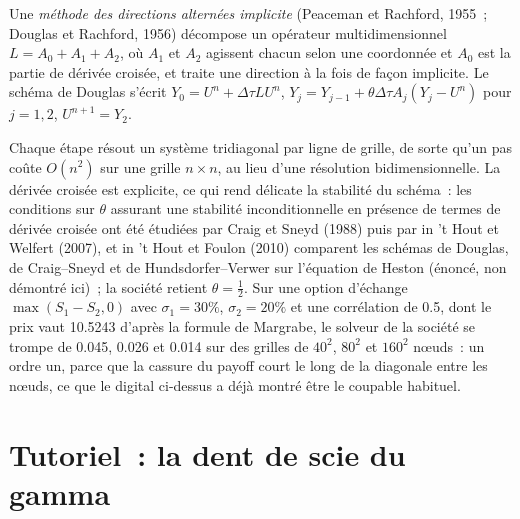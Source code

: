 \begin{definition}\label{def:qm:finite-difference-methods:adi}
Une \emph{méthode des directions alternées implicite} (Peaceman et Rachford, 1955~; Douglas et Rachford, 1956) décompose un opérateur multidimensionnel $L = A_0 + A_1 +
A_2$, où $A_1$ et $A_2$ agissent chacun selon une coordonnée et $A_0$ est la partie de dérivée croisée, et traite une direction à la fois de façon implicite. Le schéma de Douglas s'écrit $Y_0 = U^n + \Delta\tau LU^n$, $Y_j =
Y_{j-1} + \theta\Delta\tau A_j(Y_j - U^n)$ pour $j = 1, 2$, $U^{n+1} = Y_2$.
\end{definition}

Chaque étape résout un système tridiagonal par ligne de grille, de sorte qu'un pas coûte $O(n^2)$ sur une grille $n \times n$, au lieu d'une résolution bidimensionnelle. La dérivée croisée est explicite, ce qui rend délicate la stabilité du
schéma~: les conditions sur $\theta$ assurant une stabilité inconditionnelle en présence de termes de dérivée croisée ont été étudiées par Craig et Sneyd (1988) puis par in 't Hout et Welfert (2007), et in 't Hout et
Foulon (2010) comparent les schémas de Douglas, de Craig--Sneyd et de Hundsdorfer--Verwer sur l'équation de Heston (énoncé, non démontré ici)~; la société retient $\theta = \frac12$. Sur une option d'échange $\max(S_1 - S_2, 0)$ avec $\sigma_1 = 30\%$, $\sigma_2 = 20\%$ et une corrélation de 0.5, dont le prix vaut 10.5243 d'après la formule de Margrabe, le solveur de la société
se trompe de 0.045, 0.026 et 0.014 sur des grilles de $40^2$, $80^2$ et $160^2$ nœuds~: un ordre un, parce que la cassure du payoff court le long de la diagonale entre les nœuds, ce que le digital ci-dessus a déjà montré être
le coupable habituel.

\section{Tutoriel~: la dent de scie du gamma}\label{tut:qm:finite-difference-methods:sawtooth}

